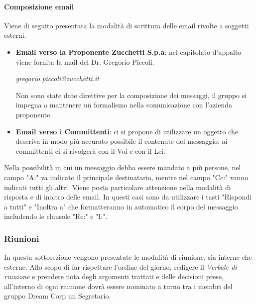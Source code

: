                 \paragraph{Composizione email}
                Viene di seguito presentata la modalità di scrittura delle email rivolte a soggetti esterni.
                \begin{itemize}
    
                    \item \textbf{Email verso la Proponente Zucchetti S.p.a}: nel capitolato d'appalto viene fornita la mail del Dr. Gregorio Piccoli.
                    \begin{center}
                        \textit{gregorio.piccoli@zucchetti.it}
                    \end{center}
                         
                    Non sono state date direttive per la composizione dei messaggi, il gruppo si impegna a mantenere un formalismo nella comunicazione con l'azienda proponente.
                    \item \textbf{Email verso i Committenti}: ci si propone di utilizzare un oggetto che descriva in modo più accurato possibile il contenute del messaggio, ai committenti ci si rivolgerà con il Voi e con il Lei.
    
                \end{itemize}
                Nella possibilità in cui un messaggio debba essere mandato a più persone, nel campo "A:" va indicato il principale destinatario, mentre nel campo "Cc:" vanno indicati tutti gli altri.
                Viene posta particolare attenzione nella modalità di risposta e di inoltro delle email. In questi casi sono da utilizzare i tasti "Rispondi a tutti" e "Inoltra a" che formatteranno in automatico il corpo del messaggio includendo le clausole "Re:" e "I:".
                \subsubsection{Riunioni}
                    In questa sottosezione vengono presentate le modalità di riunione, sia interne che esterne.
                    Allo scopo di far rispettare l'ordine del giorno, redigere il \textit{Verbale di riunione} e prendere nota degli argomenti trattati e delle decisioni prese, all'interno di ogni riunione dovrà essere nominato a turno tra i membri del gruppo Dream Corp un Segretario.
